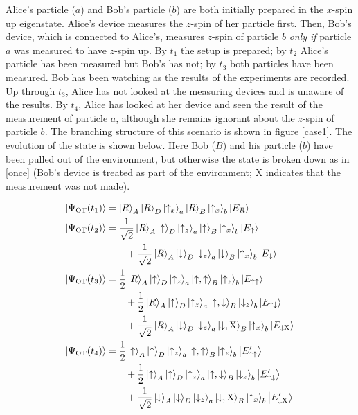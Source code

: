 \documentclass[12pt,onecolumn,secnumarabic,amsmath,amssymb,balancelastpage,nofootinbib]{article}
\newcommand{\ket}[1]{\ensuremath{\left|#1\right\rangle}}
\begin{document}
\begin{description}[font=\normalfont\scshape]
\item[Once-or-Twice] Alice's particle ($a$) and Bob's particle ($b$) are both initially prepared in the $x$-spin up eigenstate.  Alice's device measures the $z$-spin of her particle first.  Then, Bob's device, which is connected to Alice's, measures $z$-spin of particle $b$ \emph{only if} particle $a$ was measured to have $z$-spin up.  By $t_1$ the setup is prepared; by $t_2$ Alice's particle has been measured but Bob's has not; by $t_3$ both particles have been measured. Bob has been watching as the results of the experiments are recorded.  Up through $t_3$, Alice has not looked at the measuring devices and is unaware of the results.  By $t_4$, Alice has looked at her device and seen the result of the measurement of particle $a$, although she remains ignorant about the $z$-spin of particle $b$.  The branching structure of this scenario is shown in figure \ref{case1}.  The evolution of the state is shown below.  Here Bob ($B$) and {his }particle {($b$)} have been pulled out of the environment, but otherwise the state is broken down as in \eqref{once} (Bob's device is treated as part of the environment; $\text{X}$ indicates that the measurement was not made).

\begin{align}
\ket{\Psi_{\textsc{OT}}(t_1)}&=\ket{R}_A\ket{R}_{D}\ket{\uparrow_x}_a\ket{R}_B\ket{\uparrow_x}_b\ket{E_{R}}
\nonumber
\\
\ket{\Psi_{\textsc{OT}}(t_2)}&=\frac{1}{\sqrt{2}}\ket{R}_A\ket{\uparrow}_{D}\ket{\uparrow_z}_a\ket{\uparrow}_B\ket{\uparrow_x}_b\ket{E_{\uparrow}}\nonumber\\
&\qquad+\frac{1}{\sqrt{2}}\ket{R}_A\ket{\downarrow}_{D}\ket{\downarrow_z}_a\ket{\downarrow}_B\ket{\uparrow_x}_b\ket{E_{\downarrow}}
\nonumber
\\
\ket{\Psi_{\textsc{OT}}(t_3)}&=\frac{1}{2}\ket{R}_A\ket{\uparrow}_{D}\ket{\uparrow_z}_a\ket{\uparrow,\uparrow}_B\ket{\uparrow_z}_b\ket{E_{\uparrow\uparrow}}\nonumber\\
&\qquad+\frac{1}{2}\ket{R}_A\ket{\uparrow}_{D}\ket{\uparrow_z}_a\ket{\uparrow,\downarrow}_B\ket{\downarrow_z}_b\ket{E_{\uparrow\downarrow}}
\nonumber
\\
&\qquad +\frac{1}{\sqrt{2}}\ket{R}_A\ket{\downarrow}_{D}\ket{\downarrow_z}_a\ket{\downarrow,\text{X}}_B\ket{\uparrow_x}_b\ket{E_{\downarrow\text{X}}}
\nonumber
\\
\ket{\Psi_{\textsc{OT}}(t_4)}&=\frac{1}{2}\ket{\uparrow}_A\ket{\uparrow}_{D}\ket{\uparrow_z}_a\ket{\uparrow,\uparrow}_B\ket{\uparrow_z}_b\ket{E_{\uparrow\uparrow}'}\nonumber\\
&\qquad+\frac{1}{2}\ket{\uparrow}_A\ket{\uparrow}_{D}\ket{\uparrow_z}_a\ket{\uparrow,\downarrow}_B\ket{\downarrow_z}_b\ket{E_{\uparrow\downarrow}'}
\nonumber
\\
&\qquad+\frac{1}{\sqrt{2}}\ket{\downarrow}_A\ket{\downarrow}_{D}\ket{\downarrow_z}_a\ket{\downarrow,\text{X}}_B\ket{\uparrow_x}_b\ket{E_{\downarrow\text{X}}'}
\label{onceortwice}
\end{align}
\end{description}
\end{document}
